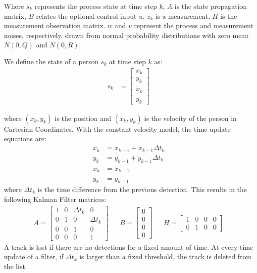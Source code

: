 Where $s_k$ represents the process state at time step $k$, $A$ is the state propagation matrix, $B$ relates the optional control input $u$, $z_k$ is a measurement, $H$ is the measurement observation matrix. $w$ and $v$ represent the process and measurement noises, respectively, drawn from normal probability distributions with zero mean $N(0,Q)$ and $N(0,R)$.

We define the state of a person $s_k$ at time step $k$ as:
\begin{align}
s_k & =
\begin{bmatrix} 
 x_k \\ 
 y_k\\
 \dot{x}_{k} \\
 \dot{y}_{k}
\end{bmatrix}
\end{align}

where $(x_k,y_k)$ is the position and $(\dot{x}_{k}, \dot{y}_{k})$ is the velocity of the person in Cartesian Coordinates. With the constant velocity model, the time update equations are:
\begin{align}
x_k&=x_{k-1}+\dot{x}_{k-1} \Delta t_k\\
y_k&=y_{k-1}+\dot{y}_{k-1} \Delta t_k\\
\dot{x}_{k}&=\dot{x}_{k-1} \\
\dot{y}_{k}&=\dot{y}_{k-1}
\end{align}
where $\Delta t_k$ is the time difference from the previous detection. This results in the following Kalman Filter matrices:
\begin{align}
A =
\begin{bmatrix} 
 1 & 0 &\Delta t_k & 0\\
 0 & 1 & 0 & \Delta t_k\\
 0 & 0 & 1 & 0\\
 0 & 0 & 0 & 1
\end{bmatrix} &&
B =
\begin{bmatrix} 
 0 \\
 0 \\
 0 \\
 0
\end{bmatrix} &&
H =
\begin{bmatrix} 
1 & 0 & 0 & 0 \\
 0 & 1 & 0 & 0
\end{bmatrix} 
\end{align}
A track is lost if there are no detections for a fixed amount of time. At every time update of a filter, if $\Delta t_k$ is larger than a fixed threshold, the track is deleted from the list.

